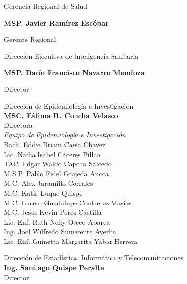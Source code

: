 \documentclass[12pt,a4paper,openany]{book}
\begin{document}
	
	\begin{center}
		
		{\large Gerencia Regional de Salud}
		
		\textbf{MSP. Javier Ramírez Escóbar}
		
		Gerente Regional \vspace{1.0cm}
		
		Dirección Ejecutiva de Inteligencia Sanitaria
		
		\textbf{MSP. Darío Francisco Navarro Mendoza}
		
		Director
		
		\vspace{1.5cm}
		\noindent
		\begin{minipage}[t]{.45\textwidth}
			\centering
			Dirección de Epidemiología e Investigación  \\
			\textbf{MSC. Fátima R. Concha Velasco}\\
			Directora \vspace{1.0cm}\\
			\textit{Equipo de Epidemiología e Investigación }\vspace{.5cm}\\
			Bach. Eddie Briam Cassa Chavez \\
			Lic. Nadia Isabel Cáceres Pillco \\
			TAP. Edgar Waldo Capcha Salcedo \\
			M.S.P. Pablo Fidel Grajeda Ancca \\
			M.C. Alex Jaramillo Corrales \\ 
			M.C. Katia Luque Quispe \\
			M.C. Lucero Guadalupe Contreras Masias \\
			M.C. Jesus Kevin Perez Castilla \\
			Lic. Enf. Ruth Nelly Oscco Abarca \\
			Ing. Joel Wilfredo Sumerente Ayerbe \\
			Lic. Enf. Guinetta Margarita Yabar Herrera \vspace{1.5cm}\\	
		\end{minipage}
		\hfill
		\noindent
		\begin{minipage}[t]{.45\textwidth}
			\centering
			Dirección de Estadística, Informática y Telecomunicaciones\\
			\textbf{Ing. Santiago Quispe Peralta} \\
			Director \vspace{1.0cm} \\

\end{minipage}
\end{center}
\end{document}
